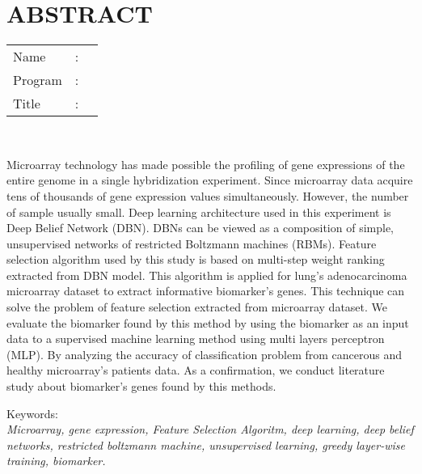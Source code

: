 %
%
%

\chapter*{ABSTRACT}

\vspace*{0.2cm}

\noindent \begin{tabular}{l l p{11.0cm}}
	Name&: & \penulis \\
	Program&: & \program \\
	Title&: & \judulInggris \\
\end{tabular} \\ 

\vspace*{0.5cm}

\noindent 
Microarray technology has made possible the profiling of gene expressions of the entire genome in a single hybridization experiment. Since microarray data acquire tens of thousands of gene expression values simultaneously. However, the number of sample usually small. Deep learning architecture used in this experiment is Deep Belief Network (DBN). DBNs can be viewed as a composition of simple, unsupervised networks of restricted Boltzmann machines (RBMs). Feature selection algorithm used by this study is based on multi-step weight ranking extracted from DBN model. This algorithm is applied for lung's adenocarcinoma microarray dataset to extract informative biomarker's genes. This technique can solve the problem of feature selection extracted from microarray dataset. We evaluate the biomarker found by this method by using the biomarker as an input data to a supervised machine learning method using multi layers perceptron (MLP). By analyzing the accuracy of classification problem from cancerous and healthy microarray's patients data. As a confirmation, we conduct literature study about biomarker's genes found by this methods. 

\vspace*{0.2cm}

\noindent Keywords: \\ 
\noindent \textit{Microarray, gene expression, Feature Selection Algoritm, deep learning, deep belief networks, restricted boltzmann machine, unsupervised learning, greedy layer-wise training, biomarker.}

\newpage